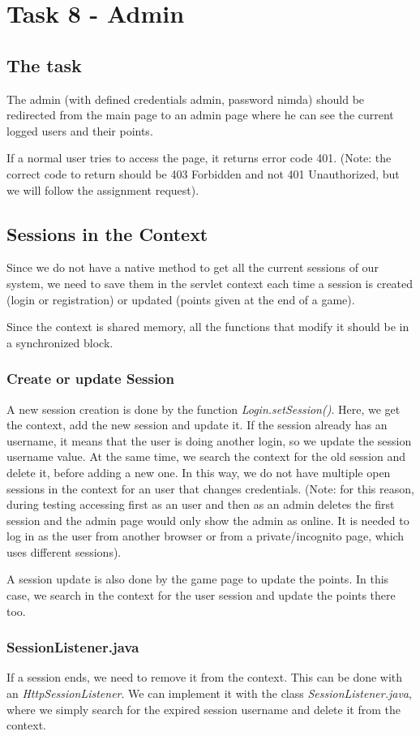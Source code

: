 \section{Task 8 - Admin}
\subsection{The task}
The admin (with defined credentials admin, password nimda) should be redirected from the main page to an admin page where he can see the current logged users and their points.

If a normal user tries to access the page, it returns error code 401. (Note: the correct code to return should be 403 Forbidden and not 401 Unauthorized, but we will follow the assignment request).
\subsection{Sessions in the Context}
Since we do not have a native method to get all the current sessions of our system, we need to save them in the servlet context each time a session is created (login or registration) or updated (points given at the end of a game).

Since the context is shared memory, all the functions that modify it should be in a synchronized block.
\subsubsection{Create or update Session}
A new session creation is done by the function \textit{Login.setSession()}. Here, we get the context, add the new session and update it. If the session already has an username, it means that the user is doing another login, so we update the session username value. At the same time, we search the context for the old session and delete it, before adding a new one. In this way, we do not have multiple open sessions in the context for an user that changes credentials. (Note: for this reason, during testing accessing first as an user and then as an admin deletes the first session and the admin page would only show the admin as online. It is needed to log in as the user from another browser or from a private/incognito page, which uses different sessions).

A session update is also done by the game page to update the points. In this case, we search in the context for the user session and update the points there too.
\subsubsection{SessionListener.java}
If a session ends, we need to remove it from the context. This can be done with an \textit{HttpSessionListener}. We can implement it with the class \textit{SessionListener.java}, where we simply search for the expired session username and delete it from the context.


